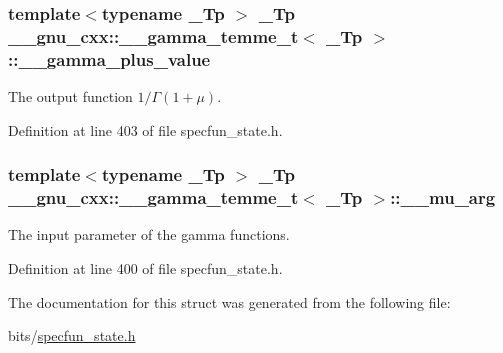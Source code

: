 \subsubsection[{\texorpdfstring{\+\_\+\+\_\+gamma\+\_\+plus\+\_\+value}{__gamma_plus_value}}]{\setlength{\rightskip}{0pt plus 5cm}template$<$typename \+\_\+\+Tp $>$ \+\_\+\+Tp {\bf \+\_\+\+\_\+gnu\+\_\+cxx\+::\+\_\+\+\_\+gamma\+\_\+temme\+\_\+t}$<$ \+\_\+\+Tp $>$\+::\+\_\+\+\_\+gamma\+\_\+plus\+\_\+value}\hypertarget{struct____gnu__cxx_1_1____gamma__temme__t_a5484bd46240c8348c2d1f0718a056665}{}\label{struct____gnu__cxx_1_1____gamma__temme__t_a5484bd46240c8348c2d1f0718a056665}


The output function $ 1/\Gamma(1 + \mu) $. 



Definition at line 403 of file specfun\+\_\+state.\+h.

\subsubsection[{\texorpdfstring{\+\_\+\+\_\+mu\+\_\+arg}{__mu_arg}}]{\setlength{\rightskip}{0pt plus 5cm}template$<$typename \+\_\+\+Tp $>$ \+\_\+\+Tp {\bf \+\_\+\+\_\+gnu\+\_\+cxx\+::\+\_\+\+\_\+gamma\+\_\+temme\+\_\+t}$<$ \+\_\+\+Tp $>$\+::\+\_\+\+\_\+mu\+\_\+arg}\hypertarget{struct____gnu__cxx_1_1____gamma__temme__t_a841e7c549dd505de260018ddaa020565}{}\label{struct____gnu__cxx_1_1____gamma__temme__t_a841e7c549dd505de260018ddaa020565}


The input parameter of the gamma functions. 



Definition at line 400 of file specfun\+\_\+state.\+h.



The documentation for this struct was generated from the following file\+:\begin{DoxyCompactItemize}
\item 
bits/\hyperlink{specfun__state_8h}{specfun\+\_\+state.\+h}\end{DoxyCompactItemize}
